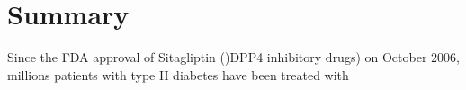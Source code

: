 \section{\label{chap:Sum} Summary}
Since the FDA approval of Sitagliptin ()DPP4 inhibitory drugs) on October  2006, millions patients with type II diabetes have been treated with 
